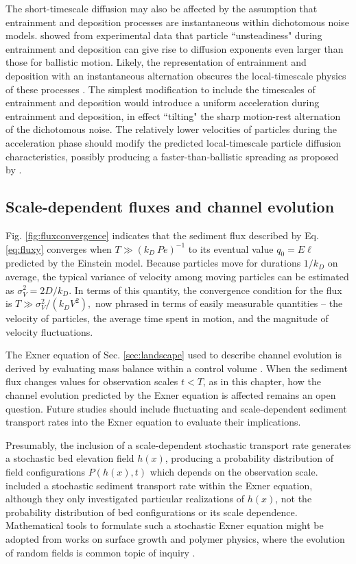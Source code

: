 The short-timescale diffusion may also be affected by the assumption that entrainment and deposition processes are instantaneous within dichotomous noise models.
\citet{Campagnol2015} showed from experimental data that particle ``unsteadiness" during entrainment and deposition can give rise to diffusion exponents even larger than those for ballistic motion.
Likely, the representation of entrainment and deposition with an instantaneous alternation obscures the local-timescale physics of these processes \citep[e.g.][]{Valyrakis2010,Celik2014}.
The simplest modification to include the timescales of entrainment and deposition would introduce a uniform acceleration during entrainment and deposition, in effect ``tilting" the sharp motion-rest alternation of the dichotomous noise. The relatively lower velocities of particles during the acceleration phase should modify the predicted local-timescale particle diffusion characteristics, possibly producing a faster-than-ballistic spreading as proposed by \citet{Campagnol2015}.

\subsection{Scale-dependent fluxes and channel evolution}

Fig. \ref{fig:fluxconvergence} indicates that the sediment flux described by Eq. \ref{eq:fluxy} converges when $T\gg (k_D\ Pe)^{-1}$ to its eventual value $q_0 = E\ell$ predicted by the Einstein model.
Because particles move for durations $1/k_D$ on average, the typical variance of velocity among moving particles can be estimated as $\sigma_V^2 = 2D/k_D$. In terms of this quantity, the convergence condition for the flux is $T\gg \sigma_V^2/(k_D V^2),$ now phrased in terms of easily measurable quantities -- the velocity of particles, the average time spent in motion, and the magnitude of velocity fluctuations.

The Exner equation of Sec. \ref{sec:landscape} used to describe channel evolution is derived by evaluating mass balance within a control volume \citep[e.g.][]{Coleman2009}. When the sediment flux changes values for observation scales $t < T$, as in this chapter, how the channel evolution predicted by the Exner equation is affected remains an open question. Future studies should include fluctuating and scale-dependent sediment transport rates into the Exner equation to evaluate their implications.

Presumably, the inclusion of a scale-dependent stochastic transport rate generates a stochastic bed elevation field $h(x)$, producing a probability distribution of field configurations $P(h(x),t)$ which depends on the observation scale.
\citet{Jerolmack2005} included a stochastic sediment transport rate within the Exner equation, although they only investigated particular realizations of $h(x)$, not the probability distribution of bed configurations or its scale dependence.
Mathematical tools to formulate such a stochastic Exner equation might be adopted from works on surface growth and polymer physics, where the evolution of random fields is common topic of inquiry \citep[e.g.][]{Kawakatsu2001,Barabasi1995, Kardar2007}.

